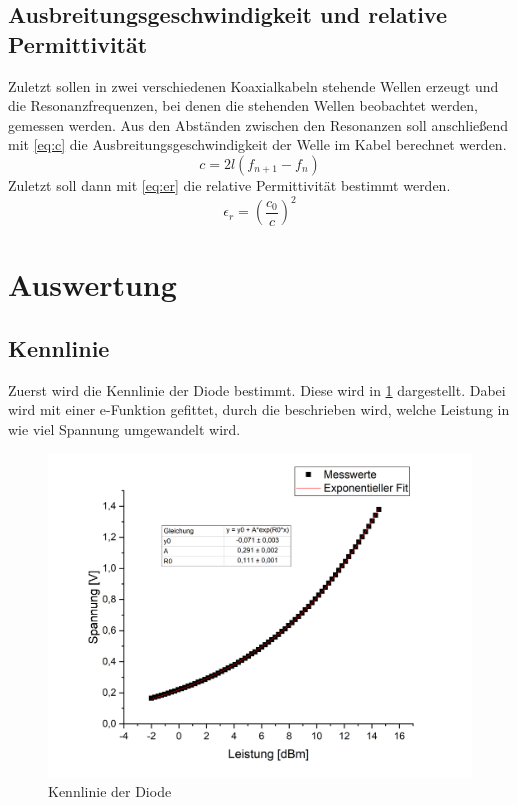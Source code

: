 \subsection{Ausbreitungsgeschwindigkeit und relative Permittivität}
Zuletzt sollen in zwei verschiedenen Koaxialkabeln stehende Wellen erzeugt und die Resonanzfrequenzen, bei denen die stehenden Wellen beobachtet werden, gemessen werden. Aus den Abständen zwischen den Resonanzen soll anschließend mit \cref{eq:c} die Ausbreitungsgeschwindigkeit der Welle im Kabel berechnet werden.
\begin{equation}
c = 2l(f_{n+1} - f_n)
\label{eq:c}
\end{equation}
Zuletzt soll dann mit \cref{eq:er} die relative Permittivität bestimmt werden.
\begin{equation}
\epsilon_r = \left( \frac{c_0}{c}\right) ^2
\label{eq:er}
\end{equation}

\section{Auswertung}
\subsection{Kennlinie}
Zuerst wird die Kennlinie der Diode bestimmt. Diese wird in \cref{fuck_scidavis} dargestellt. Dabei wird mit einer e-Funktion gefittet, durch die beschrieben wird, welche Leistung in wie viel Spannung umgewandelt wird. 

\begin{figure}[h]
	\centering
	\includegraphics[scale=0.4]{fuck_scidavis.PNG}
	\caption{Kennlinie der Diode}
	\label{fuck_scidavis}
\end{figure}

